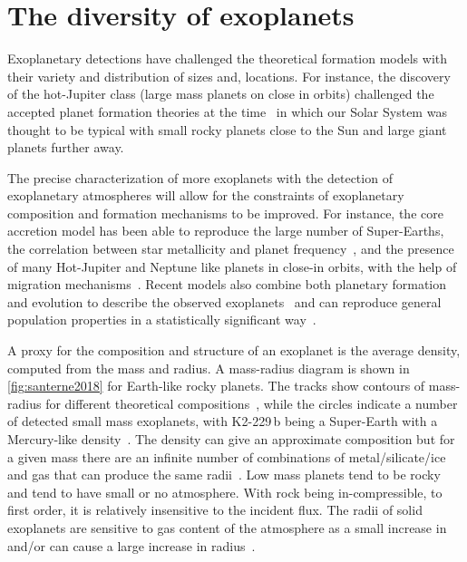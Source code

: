 
\section{The diversity of exoplanets}

Exoplanetary detections have challenged the theoretical formation models with their variety and distribution of sizes and, locations.
For instance, the discovery of the hot-Jupiter class (large mass planets on close in orbits) challenged the accepted planet formation theories at the time~\citep[.e.g][]{pollack_formation_1996, boss_giant_1997} in which our Solar System was thought to be typical with small rocky planets close to the Sun and large giant planets further away.

The precise characterization of more exoplanets with the detection of exoplanetary atmospheres will allow for the constraints of exoplanetary composition and formation mechanisms to be improved.
For instance, the core accretion model has been able to reproduce the large number of Super-Earths, the correlation between star metallicity and planet frequency~\citep[e.g.][]{santos_spectroscopic_2004, fischer_planetmetallicity_2005}, and the presence of many Hot-Jupiter and Neptune like planets in close-in orbits, with the help of migration mechanisms~\citep[e.g.][]{triaud_exoplanets_2016}.
Recent models also combine both planetary formation and evolution to describe the observed exoplanets~\citep[e.g.][]{mordasini_characterization_2012} and can reproduce general population properties in a statistically significant way~\citep{mordasini_extrasolar_2009}.

A proxy for the composition and structure of an exoplanet is the average density, computed from the mass and radius.
A mass-radius diagram is shown in \cref{fig:santerne2018} for Earth-like rocky planets.
The tracks show contours of mass-radius for different theoretical compositions~\citep{brugger_constraints_2017}, while the circles indicate a number of detected small mass exoplanets, with {K2-229\,b} being a Super-Earth with a Mercury-like density~\citep{santerne_earthsized_2018}.
The density can give an approximate composition but for a given mass there are an infinite number of combinations of metal/silicate/ice and gas that can produce the same radii~\citep[e.g.][]{seager_massradius_2007}.
Low mass planets tend to be rocky and tend to have small or no atmosphere.
With rock being in-compressible, to first order, it is relatively insensitive to the incident flux.
The radii of solid exoplanets are sensitive to gas content of the atmosphere as a small increase in  and/or  can cause a large increase in radius~\citep{adams_ocean_2008}.

